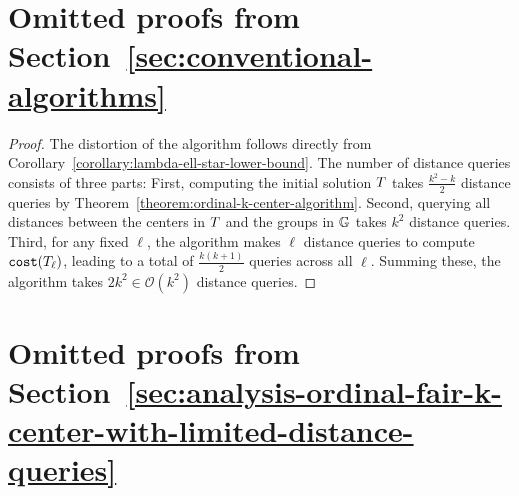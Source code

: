 \documentclass{article}
\newcommand{\bigO}{\ensuremath{\mathcal{O}}\xspace}
\begin{document}
\section{Omitted proofs from Section~\ref{sec:conventional-algorithms}}

\naiveapproach*
\begin{proof}
The distortion of the algorithm follows directly from Corollary~\ref{corollary:lambda-ell-star-lower-bound}. The number of distance queries consists of three parts: First, computing the initial solution $T$ takes $\frac{k^2 - k}{2}$ distance queries by Theorem~\ref{theorem:ordinal-k-center-algorithm}. Second, querying all distances between the centers in $T$ and the groups in $\mathbb{G}$ takes $k^2$ distance queries. Third, for any fixed $\ell$, the algorithm makes $\ell$ distance queries to compute $\texttt{cost}(T_{\ell})$, leading to a total of $\frac{k(k+1)}{2}$ queries across all $\ell$. Summing these, the algorithm takes $2 k^2 \in \bigO(k^2)$ distance queries.
\end{proof}

\section{Omitted proofs from Section~\ref{sec:analysis-ordinal-fair-k-center-with-limited-distance-queries}}
\end{document}
